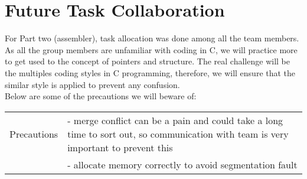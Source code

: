 \documentclass[11pt]{article}
\begin{document}
\section{Future Task Collaboration}

For Part two (assembler), task allocation was done among all the team
members. As all the group members are unfamiliar with coding in C, we will
practice more to get used to the concept of pointers and structure. The real
challenge will be the multiples coding styles in C programming, therefore, we
will ensure that the similar style is applied to prevent any confusion.\\

Below are some of the precautions we will beware of:\\

\begin{tabular}{ |p{5cm}|p{10cm}| }
\hline
Precautions
& - merge conflict can be a pain and could take a long time to
sort out, so communication with team is  very important to prevent this\\
& - allocate memory correctly to avoid segmentation fault\\
\hline
 \end{tabular}
\end{document}
